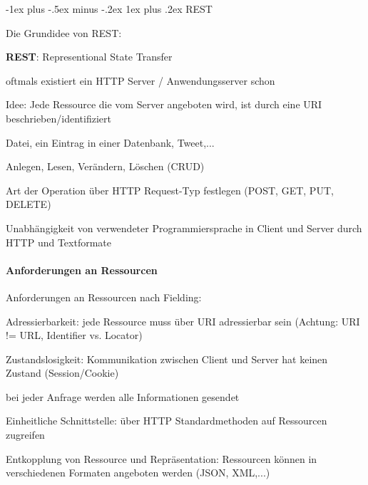 \documentclass[10pt]{article}
\makeatletter
\renewcommand{\subsubsection}{\@startsection{subsubsection}{3}{0mm}%
                                {-1ex plus -.5ex minus -.2ex}%
                                {1ex plus .2ex}%
                                {\normalfont\small\bfseries}}
\makeatother
\begin{document}
\subsubsection{REST}
\begin{itemize*}
  \item Die Grundidee von REST:
  \begin{itemize*}
    \item \textbf{REST}: Representional State Transfer
    \item oftmals existiert ein HTTP Server / Anwendungsserver schon
    \item Idee: Jede Ressource die vom Server angeboten wird, ist durch eine URI beschrieben/identifiziert
    \begin{itemize*}
      \item Datei, ein Eintrag in einer Datenbank, Tweet,...
    \end{itemize*}
    \item Anlegen, Lesen, Verändern, Löschen (CRUD)
    \begin{itemize*}
      \item Art der Operation über HTTP Request-Typ festlegen (POST, GET, PUT, DELETE)
    \end{itemize*}
    \item Unabhängigkeit von verwendeter Programmiersprache in Client und Server durch HTTP und Textformate
  \end{itemize*}
\end{itemize*}

\paragraph{Anforderungen an Ressourcen}

Anforderungen an Ressourcen nach Fielding: 
\begin{enumerate*}
  \item Adressierbarkeit: jede Ressource muss über URI adressierbar sein (Achtung: URI != URL, Identifier vs. Locator)
  \item Zustandslosigkeit: Kommunikation zwischen Client und Server hat keinen Zustand (Session/Cookie)
  \begin{itemize*}
    \item bei jeder Anfrage werden alle Informationen gesendet
  \end{itemize*}
  \item Einheitliche Schnittstelle: über HTTP Standardmethoden auf Ressourcen zugreifen
  \item Entkopplung von Ressource und Repräsentation: Ressourcen können in verschiedenen Formaten angeboten werden (JSON, XML,...)
\end{enumerate*}
\end{document}
